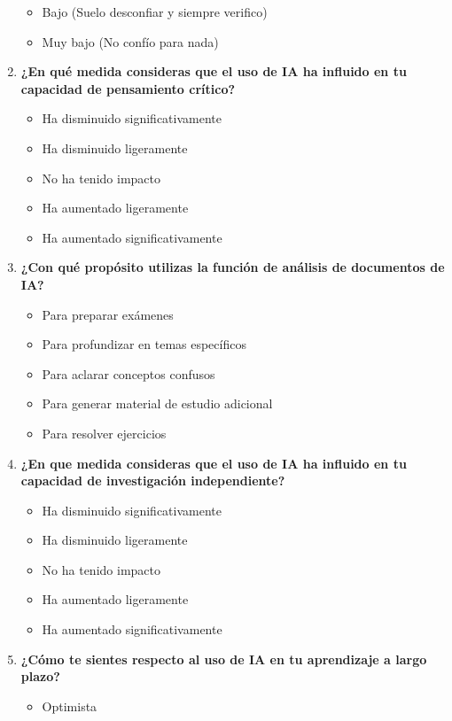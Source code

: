 \begin{multicols}{2}
\begin{enumerate}
\begin{itemize}
        \item Bajo (Suelo desconfiar y siempre verifico)
        \item Muy bajo (No confío para nada)
      \end{itemize}
      \item \textbf{¿En  qué  medida  consideras  que  el  uso  de  IA  ha  influido  en  tu  capacidad  de pensamiento  crítico?}
      \begin{itemize}
        \item Ha disminuido significativamente
        \item Ha disminuido ligeramente
        \item No ha tenido impacto
        \item Ha aumentado ligeramente
        \item Ha aumentado significativamente
      \end{itemize}
      \item \textbf{¿Con  qué  propósito  utilizas  la  función  de  análisis  de  documentos  de  IA?}
      \begin{itemize}
        \item Para preparar exámenes
        \item Para profundizar en temas específicos
        \item Para aclarar conceptos confusos
        \item Para generar material de estudio adicional
        \item Para resolver ejercicios
        \columnbreak
      \end{itemize}
      \item \textbf{¿En que medida consideras que el uso de IA  ha influido en tu capacidad de investigación independiente?}
      \begin{itemize}
        \item Ha disminuido significativamente
        \item Ha disminuido ligeramente
        \item No ha tenido impacto
        \item Ha aumentado ligeramente
        \item Ha aumentado significativamente
      \end{itemize}
      \item \textbf{¿Cómo te sientes respecto al uso de IA en tu aprendizaje a largo plazo?}
      \begin{itemize}
        \item Optimista

\end{itemize}
\end{enumerate}
\end{multicols}
